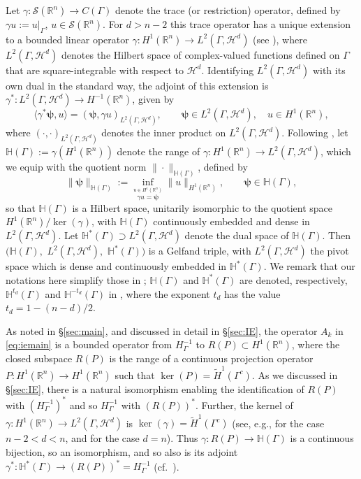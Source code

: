 \documentclass{birkjour}
\theoremstyle{definition}
\theoremstyle{remark}
\numberwithin{equation}{section}
\newcommand{\R}{\mathbb{R}}
\newcommand{\cS}{\mathcal{S}}
\newcommand{\cH}{\mathcal{H}}
\newcommand{\bH}{\mathbb{H}}
\newcommand{\bpsi}{\boldsymbol{\psi}}
\begin{document}
	Let $\gamma:\cS(\R^n)\to C(\Gamma)$ denote the trace (or restriction) operator, defined by $\gamma u := u|_\Gamma$, $u\in \cS(\R^n)$. For $d>n-2$ this  trace operator has a unique extension to a bounded linear operator $\gamma:H^1(\R^n)\to L^2(\Gamma,\cH^d)$ (see \cite[Theorem 1]{Jonsson79}), where $L^2(\Gamma,\cH^d)$ denotes the Hilbert space of complex-valued functions defined on $\Gamma$ that are square-integrable with respect to $\cH^d$. Identifying $L^2(\Gamma,\cH^d)$ with its own dual in the standard way, the adjoint of this extension is $\gamma^*:L^2(\Gamma,\cH^d)\to H^{-1}(\R^n)$,  given by
\begin{equation} \label{eq:gamadj}
\langle\gamma^* \bpsi,u\rangle = (\bpsi,\gamma u)_{L^2(\Gamma,\cH^d)}, \qquad \bpsi\in L^2(\Gamma,\cH^d), \quad u\in H^1(\R^n),
\end{equation}
where $(\cdot,\cdot)_{L^2(\Gamma,\cH^d)}$ denotes the inner product on $L^2(\Gamma,\cH^d)$. Following \cite{caetano2025integral}, let $\bH(\Gamma):= \gamma(H^1(\R^n))$ denote the range of $\gamma:H^1(\R^n)\to L^2(\Gamma,\cH^d)$, which we equip with the quotient norm $\|\cdot\|_{\bH(\Gamma)}$, defined by
\begin{equation} \label{eq:bHnormdef}
\|\bpsi\|_{\bH(\Gamma)} := \inf_{\stackrel{u\in H^1(\R^n)}{\gamma u = \bpsi}}\|u\|_{H^1(\R^n)}, \qquad \bpsi \in \bH(\Gamma),
\end{equation}
so that $\bH(\Gamma)$ is a Hilbert space, unitarily isomorphic to the quotient space $H^1(\R^n)/\ker(\gamma)$, with $\bH(\Gamma)$ continuously embedded and dense in $L^2(\Gamma,\cH^d)$. Let $\bH^*(\Gamma)\supset L^2(\Gamma,\cH^d)$ denote the dual space of $\bH(\Gamma)$. Then $(\bH(\Gamma),$ $L^2(\Gamma,\cH^d),$ $\bH^*(\Gamma))$ is a Gelfand triple, with $L^2(\Gamma,\cH^d)$ the pivot space which is dense and continuously embedded in $\bH^*(\Gamma)$. We remark that our notations here simplify those in \cite{caetano2025integral}; $\bH(\Gamma)$ and $\bH^*(\Gamma)$ are denoted, respectively, $\bH^{t_d}(\Gamma)$ and $\bH^{-t_d}(\Gamma)$ in \cite[\S3.2]{caetano2025integral}, where the exponent $t_d$ has the value $t_d=1-(n-d)/2$.

As noted in \S\ref{sec:main}, and discussed in detail in \S\ref{sec:IE}, the operator $A_k$ in \eqref{eq:iemain} is a bounded operator from $H_\Gamma^{-1}$ to $R(P)\subset H^1(\R^n)$, where the closed subspace $R(P)$ is the range of a continuous projection operator $P:H^1(\R^n)\to H^1(\R^n)$ such that $\ker(P) = \widetilde H^1(\Gamma^c)$. As we discussed in \S\ref{sec:IE}, there is a natural isomorphism enabling the identification of $R(P)$ with $(H_\Gamma^{-1})^*$ and so $H_\Gamma^{-1}$ with $(R(P))^*$. Further, the kernel of $\gamma:H^1(\R^n)\to L^2(\Gamma,\cH^d)$ is $\ker(\gamma)=\widetilde H^1(\Gamma^c)$ (see, e.g., \cite[Theorem 3.9]{caetano2025integral} for the case $n-2<d<n$, and \cite[Corollary 3.2]{hinz25} for the case $d=n$). Thus $\gamma:R(P) \to \bH(\Gamma)$ is a continuous bijection, so an isomorphism, and so also is its adjoint $\gamma^*:\bH^*(\Gamma)\to (R(P))^* =H^{-1}_\Gamma$ (cf.~\cite[Theorem 3.9]{caetano2025integral}).
\end{document}
